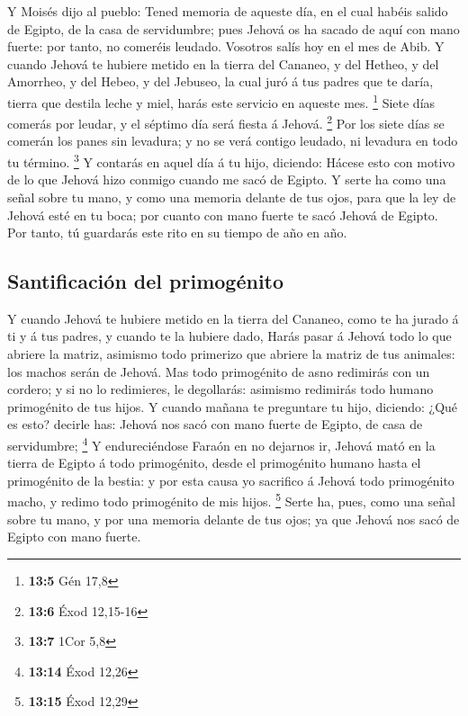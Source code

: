  Y Moisés dijo al pueblo: Tened memoria de aqueste día, en
el cual habéis salido de Egipto, de la casa de servidumbre; pues Jehová
os ha sacado de aquí con mano fuerte: por tanto, no comeréis leudado.
 Vosotros salís hoy en el mes de Abib.  Y
cuando Jehová te hubiere metido en la tierra del Cananeo, y del Hetheo,
y del Amorrheo, y del Hebeo, y del Jebuseo, la cual juró á tus padres
que te daría, tierra que destila leche y miel, harás este servicio en
aqueste mes. \footnote{\textbf{13:5} Gén 17,8}  Siete días
comerás por leudar, y el séptimo día será fiesta á Jehová. \footnote{\textbf{13:6}
  Éxod 12,15-16}  Por los siete días se comerán los panes
sin levadura; y no se verá contigo leudado, ni levadura en todo tu
término. \footnote{\textbf{13:7} 1Cor 5,8}  Y contarás en
aquel día á tu hijo, diciendo: Hácese esto con motivo de lo que Jehová
hizo conmigo cuando me sacó de Egipto.  Y serte ha como
una señal sobre tu mano, y como una memoria delante de tus ojos, para
que la ley de Jehová esté en tu boca; por cuanto con mano fuerte te sacó
Jehová de Egipto.  Por tanto, tú guardarás este rito en
su tiempo de año en año.

\hypertarget{santificaciuxf3n-del-primoguxe9nito}{%
\subsection{Santificación del
primogénito}\label{santificaciuxf3n-del-primoguxe9nito}}

 Y cuando Jehová te hubiere metido en la tierra del
Cananeo, como te ha jurado á ti y á tus padres, y cuando te la hubiere
dado,  Harás pasar á Jehová todo lo que abriere la
matriz, asimismo todo primerizo que abriere la matriz de tus animales:
los machos serán de Jehová.  Mas todo primogénito de asno
redimirás con un cordero; y si no lo redimieres, le degollarás: asimismo
redimirás todo humano primogénito de tus hijos.  Y cuando
mañana te preguntare tu hijo, diciendo: ¿Qué es esto? decirle has:
Jehová nos sacó con mano fuerte de Egipto, de casa de servidumbre;
\footnote{\textbf{13:14} Éxod 12,26}  Y endureciéndose
Faraón en no dejarnos ir, Jehová mató en la tierra de Egipto á todo
primogénito, desde el primogénito humano hasta el primogénito de la
bestia: y por esta causa yo sacrifico á Jehová todo primogénito macho, y
redimo todo primogénito de mis hijos. \footnote{\textbf{13:15} Éxod
  12,29}  Serte ha, pues, como una señal sobre tu mano, y
por una memoria delante de tus ojos; ya que Jehová nos sacó de Egipto
con mano fuerte.

